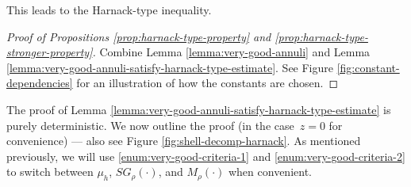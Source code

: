 \documentclass[12pt]{amsart}
\numberwithin{equation}{section}
\newcommand{\Mrho}[2]{\hyperref[eq:alternate-size]{M_{#1}(#2)}}
\newcommand{\SGrho}[2]{\hyperref[eq:alternate-size-2]{SG_{#1}(#2)}}
\begin{document}
	
	
	This leads to the Harnack-type inequality. 
	\begin{proof}[Proof of Propositions \ref{prop:harnack-type-property} and \ref{prop:harnack-type-stronger-property}]
		Combine Lemma \ref{lemma:very-good-annuli} and Lemma \ref{lemma:very-good-annuli-satisfy-harnack-type-estimate}.  
		See Figure \ref{fig:constant-dependencies} for an illustration of how the constants are chosen. 
	\end{proof}
	

	
	The proof of Lemma \ref{lemma:very-good-annuli-satisfy-harnack-type-estimate} is purely deterministic. We now outline the proof (in the case~$z = 0$ for convenience) --- also see Figure \ref{fig:shell-decomp-harnack}. 
	As mentioned previously, we will use \ref{enum:very-good-criteria-1} and \ref{enum:very-good-criteria-2}  to switch between $\mu_h$, $\SGrho{\rho}{\cdot}$, and $\Mrho{\rho}{\cdot}$ when convenient. 
\end{document}
